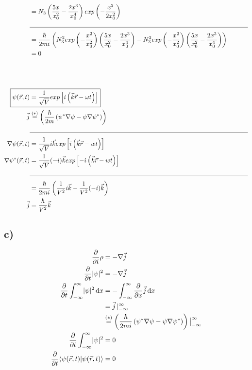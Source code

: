 \begin{align*}
        &= N_3 \left( \frac{5x}{x_0^2} - \frac{2x^3}{x_0^4} \right) exp \left( -\frac{x^2}{2x_0^2} \right)\\
        &\text{\noindent\makebox[\linewidth]{\rule{\linewidth}{0.4pt}}}\\
        &= \frac{\hbar}{2mi} \left( N_3^2 exp \left( -\frac{x^2}{x_0^2} \right) \left( \frac{5x}{x_0^2} - \frac{2x^3}{x_0^4} \right) - N_3^2 exp \left( -\frac{x^2}{x_0^2} \right) \left( \frac{5x}{x_0^2} - \frac{2x^3}{x_0^4} \right) \right)\\
        &= 0\\
        \\
        \\
        \\
        \Aboxed{\psi(\vec{r}, t) &= \frac{1}{\sqrt{V}} exp \left[ i \left( \vec{k} \vec{r} - \omega t \right) \right]}\\
        \vec{j} &\stackrel{(*)}{=} \left( \frac{\hbar}{2m} \left( \psi^* \nabla \psi - \psi \nabla \psi^* \right) \right)\\
        &\text{\noindent\makebox[\linewidth]{\rule{\linewidth}{0.4pt}}}\\
        \nabla \psi(\vec{r}, t) &= \frac{1}{\sqrt{V}} i\vec{k} exp \left[ i \left( \vec{k} \vec{r} - wt \right) \right]\\
        \nabla \psi^*(\vec{r}, t) &= \frac{1}{\sqrt{V}} (-i)\vec{k} exp \left[ -i \left( \vec{k} \vec{r} - wt \right) \right]\\
        &\text{\noindent\makebox[\linewidth]{\rule{\linewidth}{0.4pt}}}\\
        &= \frac{\hbar}{2mi} \left( \frac{1}{V^2} i\vec{k} - \frac{1}{V^2} (-i)\vec{k} \right)\\
        \vec{j} &= \frac{\hbar}{V^2} \vec{k}
    \end{align*}

\subsection{c)}

    \begin{align*}
        \frac{\partial}{\partial t} \rho &= -\nabla \vec{j}\\
        \frac{\partial}{\partial t} \lvert\psi\rvert^2 &= - \nabla \vec{j}\\
        \frac{\partial}{\partial t} \int_{-\infty}^{\infty}  \lvert\psi\rvert^2 \,\mathrm{d}x &= -\int_{-\infty}^{\infty}  \frac{\partial}{\partial x} \vec{j} \,\mathrm{d}x\\
        &= \vec{j}\, \vert_{-\infty}^{\infty}\\
        &\stackrel{(*)}{=} \left( \frac{\hbar}{2mi} \left( \psi^* \nabla \psi - \psi \nabla \psi^*   \right) \right) \big|_{-\infty}^{\infty}\\
        \frac{\partial}{\partial t} \int_{-\infty}^{\infty} \lvert\psi\rvert^2 &= 0\\
        \frac{\partial}{\partial t} \langle \psi(\vec{r}, t) \vert \psi(\vec{r}, t) \rangle &= 0
    \end{align*}



